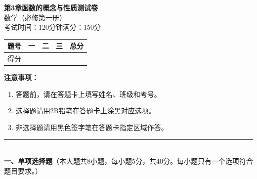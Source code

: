 \documentclass[12pt, a4paper]{ctexart}
\begin{document}
\begin{center}
{\Large\bfseries 第3章\quad 函数的概念与性质\quad 测试卷}\\[6pt]
{\normalsize 数学（必修第一册）}\\[4pt]
{\small 考试时间：120分钟\quad 满分：150分}
\end{center}

\vspace{2pt}
\begin{center}
\begin{tabular}{|c|c|c|c|c|}
\hline
题号 & 一 & 二 & 三 & 总分 \\ \hline
得分 & & & & \\ \hline
\end{tabular}
\end{center}
\vspace{4pt}

\noindent\textbf{注意事项：}
\begin{enumerate}[leftmargin=2em]
  \item 答题前，请在答题卡上填写姓名、班级和考号。
  \item 选择题请用2B铅笔在答题卡上涂黑对应选项。
  \item 非选择题请用黑色签字笔在答题卡指定区域作答。
\end{enumerate}

\vspace{6pt}

\noindent\rule{\textwidth}{0.4pt}\\[2pt]
{\large\bfseries 一、单项选择题}（本大题共8小题，每小题5分，共40分。每小题只有一个选项符合题目要求。）

\vspace{6pt}
\end{document}
